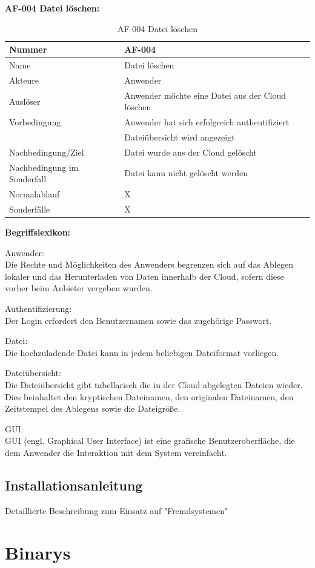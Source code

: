 \documentclass[12pt,a4paper,bibliography=totocnumbered,listof=totocnumbered]{scrartcl}
\begin{document}
\begin{appendix}
\textbf{AF-004 Datei l\"oschen:}
\begin{table}[!h]
	\centering
	\begin{tabular}{|l|l|}
		\hline
		Nummer & AF-004\\
		\hline
		Name & Datei löschen\\
		\hline
		Akteure & Anwender\\
		\hline
		Auslöser & Anwender möchte eine Datei aus der Cloud löschen\\
		\hline
		Vorbedingung & Anwender hat sich erfolgreich authentifiziert \\ & Dateiübersicht wird angezeigt\\
		\hline
		Nachbedingung/Ziel & Datei wurde aus der Cloud gelöscht \\
		\hline
		Nachbedingung im Sonderfall & Datei kann nicht gelöscht werden \\
		\hline
		Normalablauf & X\\
		\hline
		Sonderfälle & X \\
		\hline
	\end{tabular}
	\caption{AF-004 Datei löschen}
	\label{tab:AF-004 Datei loeschen}
\end{table}
\pagebreak

\textbf{Begriffslexikon:}

\begin{compactitem}
\item Anwender:\\
Die Rechte und Möglichkeiten des Anwenders begrenzen sich auf das Ablegen lokaler und das Herunterladen von Daten innerhalb der Cloud, sofern diese vorher beim Anbieter vergeben wurden.
\item Authentifizierung:\\
Der Login erfordert den Benutzernamen sowie das zugehörige Passwort.
\item Datei:\\
Die hochzuladende Datei kann in jedem beliebigen Dateiformat vorliegen.
\item Dateiübersicht:\\
Die Dateiübersicht gibt tabellarisch die in der Cloud abgelegten Dateien wieder. Dies beinhaltet den kryptischen Dateinamen, den originalen Dateinamen, den Zeitstempel des Ablegens sowie die Dateigröße.
\item GUI:\\
GUI (engl. Graphical User Interface) ist eine grafische Benutzeroberfläche, die dem Anwender die Interaktion mit dem System vereinfacht.
\end{compactitem}

\subsection{Installationsanleitung}
Detaillierte Beschreibung zum Einsatz auf "Fremdsystemen"
\pagebreak
\section{Binarys}
\end{appendix}
\end{document}
